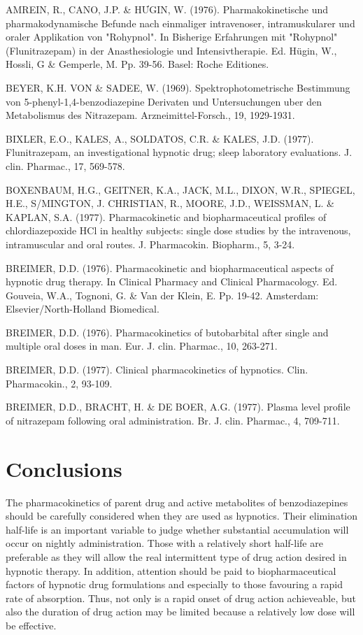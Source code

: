 \documentclass[10pt]{article}
\begin{document}
AMREIN, R., CANO, J.P. \& HƯGIN, W. (1976). Pharmakokinetische und pharmakodynamische Befunde nach einmaliger intravenoser, intramuskularer und oraler Applikation von "Rohypnol". In Bisherige Erfahrungen mit "Rohypnol" (Flunitrazepam) in der Anasthesiologie und Intensivtherapie. Ed. Hügin, W., Hossli, G \& Gemperle, M. Pp. 39-56. Basel: Roche Editiones.

BEYER, K.H. VON \& SADEE, W. (1969). Spektrophotometrische Bestimmung von 5-phenyl-1,4-benzodiazepine Derivaten und Untersuchungen uber den Metabolismus des Nitrazepam. Arzneimittel-Forsch., 19, 1929-1931.

BIXLER, E.O., KALES, A., SOLDATOS, C.R. \& KALES, J.D. (1977). Flunitrazepam, an investigational hypnotic drug; sleep laboratory evaluations. J. clin. Pharmac., 17, 569-578.

BOXENBAUM, H.G., GEITNER, K.A., JACK, M.L., DIXON, W.R., SPIEGEL, H.E., S/MINGTON, J. CHRISTIAN, R., MOORE, J.D., WEISSMAN, L. \& KAPLAN, S.A. (1977). Pharmacokinetic and biopharmaceutical profiles of chlordiazepoxide $\mathrm{HCl}$ in healthy subjects: single dose studies by the intravenous, intramuscular and oral routes. J. Pharmacokin. Biopharm., 5, 3-24.

BREIMER, D.D. (1976). Pharmacokinetic and biopharmaceutical aspects of hypnotic drug therapy. In Clinical Pharmacy and Clinical Pharmacology. Ed. Gouveia, W.A., Tognoni, G. \& Van der Klein, E. Pp. 19-42. Amsterdam: Elsevier/North-Holland Biomedical.

BREIMER, D.D. (1976). Pharmacokinetics of butobarbital after single and multiple oral doses in man. Eur. J. clin. Pharmac., 10, 263-271.

BREIMER, D.D. (1977). Clinical pharmacokinetics of hypnotics. Clin. Pharmacokin., 2, 93-109.

BREIMER, D.D., BRACHT, H. \& DE BOER, A.G. (1977). Plasma level profile of nitrazepam following oral administration. Br. J. clin. Pharmac., 4, 709-711.

\section*{Conclusions}
The pharmacokinetics of parent drug and active metabolites of benzodiazepines should be carefully considered when they are used as hypnotics. Their elimination half-life is an important variable to judge whether substantial accumulation will occur on nightly administration. Those with a relatively short half-life are preferable as they will allow the real intermittent type of drug action desired in hypnotic therapy. In addition, attention should be paid to biopharmaceutical factors of hypnotic drug formulations and especially to those favouring a rapid rate of absorption. Thus, not only is a rapid onset of drug action achieveable, but also the duration of drug action may be limited because a relatively low dose will be effective.
\end{document}
